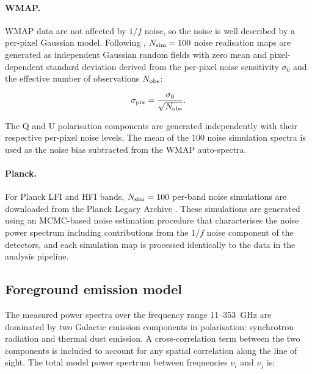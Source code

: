 \paragraph{WMAP.} WMAP data are not affected by $1/f$ noise, so the noise is well described by a per-pixel Gaussian model. Following \citet{WMAP_maps}, $N_{\rm sim} = 100$ noise realisation maps are generated as independent Gaussian random fields with zero mean and pixel-dependent standard deviation derived from the per-pixel noise sensitivity $\sigma_0$ and the effective number of observations $N_{\rm obs}$:

\begin{equation}
    \label{eq:wmap_noise}
    \sigma_{\rm pix} = \frac{\sigma_0}{\sqrt{N_{\rm obs}}}.
\end{equation}

The Q and U polarisation components are generated independently with their respective per-pixel noise levels. The mean of the 100 noise simulation spectra is used as the noise bias subtracted from the WMAP auto-spectra.

\paragraph{Planck.} For Planck LFI and HFI bands, $N_{\rm sim} = 100$ per-band noise simulations are downloaded from the Planck Legacy Archive \citep{Planck_2020LVII, Planck_2018I}. These simulations are generated using an MCMC-based noise estimation procedure \citep{Planck_2014II} that characterises the noise power spectrum including contributions from the $1/f$ noise component of the detectors, and each simulation map is processed identically to the data in the analysis pipeline.

\subsection{Foreground emission model}
\label{sec:foreground_model}

The measured power spectra over the frequency range 11--353~GHz are dominated by two Galactic emission components in polarisation: synchrotron radiation and thermal dust emission. A cross-correlation term between the two components is included to account for any spatial correlation along the line of sight. The total model power spectrum between frequencies $\nu_i$ and $\nu_j$ is:

